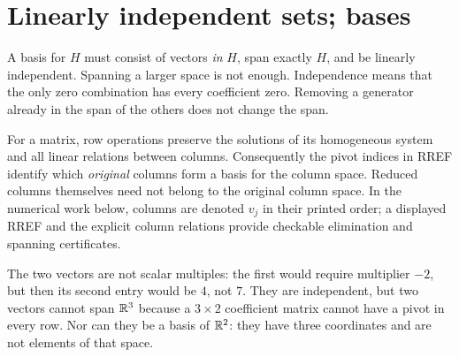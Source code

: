\section{Linearly independent sets; bases}
A basis for $H$ must consist of vectors \emph{in} $H$, span exactly $H$,
and be linearly independent. Spanning a larger space is not enough.
Independence means that the only zero combination has every coefficient
zero. Removing a generator already in the span of the others does not
change the span.

For a matrix, row operations preserve the solutions of its homogeneous
system and all linear relations between columns. Consequently the pivot
indices in RREF identify which \emph{original} columns form a basis for
the column space. Reduced columns themselves need not belong to the original
column space. In the numerical work below, columns are denoted $v_j$ in
their printed order; a displayed RREF and the explicit column relations
provide checkable elimination and spanning certificates.

The two vectors are not scalar multiples: the first would require
multiplier $-2$, but then its second entry would be $4$, not $7$.
They are independent, but two vectors cannot span $\mathbb{R}^3$ because a
$3\times2$ coefficient matrix cannot have a pivot in every row.
Nor can they be a basis of $\mathbb{R}^2$: they have three coordinates and
are not elements of that space.

